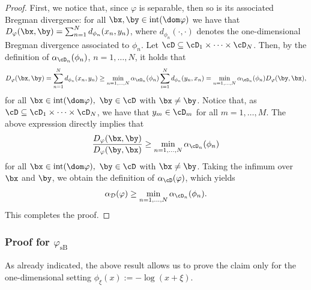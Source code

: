 \documentclass[11pt]{amsart}
\begin{document}
\begin{proof}
First, we notice that, since $\varphi$ is separable, then so is its associated Bregman divergence: for all $\bx, \by\in\mathrm{int}(\dom \varphi)$ we have that $D_{\varphi}(\bx,\by)=\sum_{n=1}^N d_{\phi_n}(x_n, y_n)$, where $d_{\phi_n}(\cdot,\cdot)$ denotes the one-dimensional Bregman divergence associated to $\phi_n$. Let $\cD\subseteq\cD_1\times\cdots\times\cD_N$. Then, by the definition of $\alpha_{\cD_n}(\phi_n)$, $n=1,\ldots, N$, it holds that
$$
D_{\varphi}(\bx,\by)=\sum_{n=1}^N d_{\phi_n}(x_n,y_n) \geq \min_{n=1,...,N} \alpha_{\cD_n}(\phi_n) \sum_{i=1}^N d_{\phi_n}(y_n,x_n)= \min_{n=1,...,N} \alpha_{\cD_n}(\phi_n) D_{\varphi}(\by,\bx),
$$
for all $\bx\in\mathrm{int}(\dom \varphi), \ \by\in\cD$ with $\bx\neq \by$. Notice that, as $\cD\subseteq \cD_1\times\cdots\times \cD_N$, we have that $y_m\in\cD_m$ for all $m=1,\ldots, M$. The above expression directly implies that  
$$
\frac{D_{\varphi}(\bx,\by)}{D_{\varphi}(\by,\bx)} \geq \min_{n=1,...,N} \alpha_{\cD_n}(\phi_n)
$$
for all $\bx\in\mathrm{int}(\dom \varphi), \ \by\in\cD$ with $\bx\neq\by$. Taking the infimum over $\bx$ and $\by$, we obtain the definition of $\alpha_\cD(\varphi)$, which yields
$$
\alpha_{\mathcal{D}}(\varphi) \geq \min_{n=1,...,N} \alpha_{\cD_n}(\phi_n).
$$
This completes the proof.
\end{proof}

\subsubsection{\texorpdfstring{Proof for $\varphi_\mathrm{sB}$}{varphi=sBurg}}

As already indicated, the above result allows us to prove the claim only for the one-dimensional setting $\phi_\xi(x):= - \log (x+\xi)$.
\end{document}

